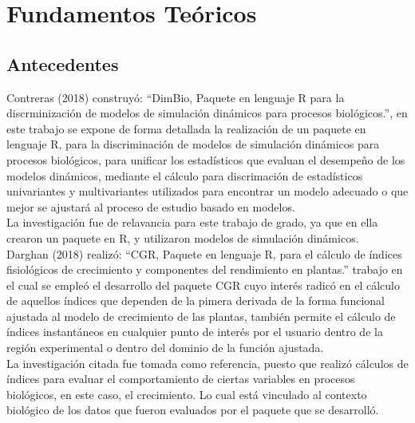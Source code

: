 \chapter{Fundamentos Te\'oricos}

\section{Antecedentes}

Contreras (2018)  construy\'o: “DimBio, Paquete en lenguaje R para la discrminizaci\'on de modelos de simulaci\'on din\'amicos para procesos biol\'ogicos.”, en este trabajo se expone de forma detallada la realizaci\'on de un paquete en lenguaje R, para la discriminaci\'on de modelos de simulaci\'on din\'amicos para procesos biol\'ogicos, para unificar los estad\'isticos que evaluan el desempeño de los modelos din\'amicos, mediante el c\'alculo para discrimaci\'on de estad\'isticos univariantes y multivariantes utilizados para encontrar un modelo adecuado o que mejor se ajustar\'a al proceso de estudio basado en modelos.\\ 

La investigaci\'on fue de relavancia para este trabajo de grado, ya que en ella crearon un paquete en R, y utilizaron modelos de simulaci\'on din\'amicos.\\

Darghan (2018) realiz\'o: “CGR, Paquete en lenguaje R, para el cálculo de índices fisiológicos de crecimiento y componentes del rendimiento en plantas.” trabajo en el cual se emple\'o el desarrollo del paquete CGR cuyo interés radicó en el cálculo de aquellos índices que dependen de la pimera derivada de la forma funcional ajustada al modelo de crecimiento de las plantas, también permite el cálculo de índices instantáneos en cualquier punto de interés por el usuario dentro de la región experimental o dentro del dominio de la función ajustada.\\

La investigaci\'on citada fue tomada como referencia, puesto que realizó cálculos de índices para evaluar el comportamiento de ciertas variables en procesos biol\'ogicos, en este caso, el crecimiento. Lo cual est\'a vinculado al contexto biol\'ogico de los datos que fueron evaluados por el paquete que se desarroll\'o.\\

